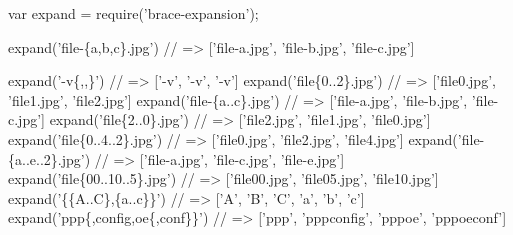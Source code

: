 \begin{DoxyCode}
var expand = require(\textcolor{stringliteral}{'brace-expansion'});

expand(\textcolor{stringliteral}{'file-\{a,b,c\}.jpg'})
\textcolor{comment}{// => ['file-a.jpg', 'file-b.jpg', 'file-c.jpg']}

expand('-v\{,,\}\textcolor{stringliteral}{')}
\textcolor{stringliteral}{// => ['}-v\textcolor{stringliteral}{', '}-v\textcolor{stringliteral}{', '}-v\textcolor{stringliteral}{']}
\textcolor{stringliteral}{}
\textcolor{stringliteral}{expand('}file\{0..2\}.jpg\textcolor{stringliteral}{')}
\textcolor{stringliteral}{// => ['}file0.jpg\textcolor{stringliteral}{', '}file1.jpg\textcolor{stringliteral}{', '}file2.jpg\textcolor{stringliteral}{']}
\textcolor{stringliteral}{}
\textcolor{stringliteral}{expand('}file-\{a..c\}.jpg\textcolor{stringliteral}{')}
\textcolor{stringliteral}{// => ['}file-a.jpg\textcolor{stringliteral}{', '}file-b.jpg\textcolor{stringliteral}{', '}file-c.jpg\textcolor{stringliteral}{']}
\textcolor{stringliteral}{}
\textcolor{stringliteral}{expand('}file\{2..0\}.jpg\textcolor{stringliteral}{')}
\textcolor{stringliteral}{// => ['}file2.jpg\textcolor{stringliteral}{', '}file1.jpg\textcolor{stringliteral}{', '}file0.jpg\textcolor{stringliteral}{']}
\textcolor{stringliteral}{}
\textcolor{stringliteral}{expand('}file\{0..4..2\}.jpg\textcolor{stringliteral}{')}
\textcolor{stringliteral}{// => ['}file0.jpg\textcolor{stringliteral}{', '}file2.jpg\textcolor{stringliteral}{', '}file4.jpg\textcolor{stringliteral}{']}
\textcolor{stringliteral}{}
\textcolor{stringliteral}{expand('}file-\{a..e..2\}.jpg\textcolor{stringliteral}{')}
\textcolor{stringliteral}{// => ['}file-a.jpg\textcolor{stringliteral}{', '}file-c.jpg\textcolor{stringliteral}{', '}file-e.jpg\textcolor{stringliteral}{']}
\textcolor{stringliteral}{}
\textcolor{stringliteral}{expand('}file\{00..10..5\}.jpg\textcolor{stringliteral}{')}
\textcolor{stringliteral}{// => ['}file00.jpg\textcolor{stringliteral}{', '}file05.jpg\textcolor{stringliteral}{', '}file10.jpg\textcolor{stringliteral}{']}
\textcolor{stringliteral}{}
\textcolor{stringliteral}{expand('}\{\{A..C\},\{a..c\}\}\textcolor{stringliteral}{')}
\textcolor{stringliteral}{// => ['}A\textcolor{stringliteral}{', '}B\textcolor{stringliteral}{', '}C\textcolor{stringliteral}{', '}a\textcolor{stringliteral}{', '}b\textcolor{stringliteral}{', '}c\textcolor{stringliteral}{']}
\textcolor{stringliteral}{}
\textcolor{stringliteral}{expand('}ppp\{,config,oe\{,conf\}\}\textcolor{stringliteral}{')}
\textcolor{stringliteral}{// => ['}ppp\textcolor{stringliteral}{', '}pppconfig\textcolor{stringliteral}{', '}pppoe\textcolor{stringliteral}{', '}pppoeconf\textcolor{stringliteral}{']}
\end{DoxyCode}


